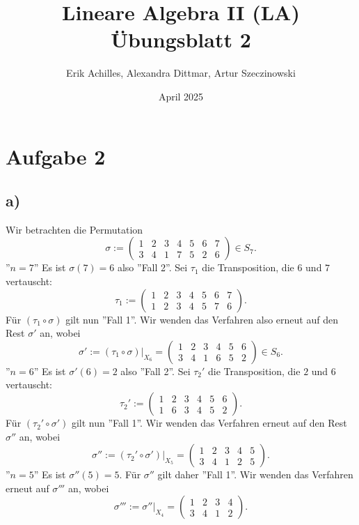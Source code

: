 \documentclass{article}
\title{Lineare Algebra II (LA) Übungsblatt 2}
\author{Erik Achilles, Alexandra Dittmar, Artur Szeczinowski}
\date{April 2025}
\begin{document}
\section*{Aufgabe 2}

\subsection*{a)}
Wir betrachten die Permutation
\[
\sigma := \begin{pmatrix}
  1 & 2 & 3 & 4 & 5 & 6 & 7 \\
  3 & 4 & 1 & 7 & 5 & 2 & 6
  \end{pmatrix} \in S_7.
\]
''$n=7$''
Es ist
$\sigma(7) = 6$
also ''Fall 2''.
Sei
$\tau_1$
die Transposition,
die $6$ und $7$ vertauscht:
\[
\tau_1 := \begin{pmatrix}
  1 & 2 & 3 & 4 & 5 & 6 & 7 \\
  1 & 2 & 3 & 4 & 5 & 7 & 6
  \end{pmatrix}.
\]
Für
$(\tau_1 \circ \sigma)$
gilt nun ''Fall 1''.
Wir wenden das Verfahren also erneut auf den Rest
$\sigma'$ an, wobei
\[
  \sigma' := (\tau_1 \circ \sigma)|_{X_6} = \begin{pmatrix}
  1 & 2 & 3 & 4 & 5 & 6 \\
  3 & 4 & 1 & 6 & 5 & 2
  \end{pmatrix} \in S_6.
\]
''$n=6$''
Es ist
$\sigma'(6) = 2$
also ''Fall 2''.
Sei
$\tau_2'$
die Transposition,
die $2$ und $6$ vertauscht:
\[
\tau_2' := \begin{pmatrix}
  1 & 2 & 3 & 4 & 5 & 6 \\
  1 & 6 & 3 & 4 & 5 & 2
  \end{pmatrix}.
\]
Für
$(\tau_2' \circ \sigma')$
gilt nun ''Fall 1''.
Wir wenden das Verfahren erneut auf den Rest
$\sigma''$ an, wobei
\[
  \sigma'' := (\tau_2' \circ \sigma')|_{X_5} = \begin{pmatrix}
  1 & 2 & 3 & 4 & 5 \\
  3 & 4 & 1 & 2 & 5
  \end{pmatrix}.
\]
''$n=5$'' Es ist
$\sigma''(5) = 5$.
Für 
$\sigma''$
gilt daher ''Fall 1''.
Wir wenden das Verfahren erneut auf $\sigma'''$ an, wobei
\[
\sigma''' := \sigma''|_{X_4} = \begin{pmatrix}
  1 & 2 & 3 & 4 \\
  3 & 4 & 1 & 2
  \end{pmatrix}.
\]
\end{document}
